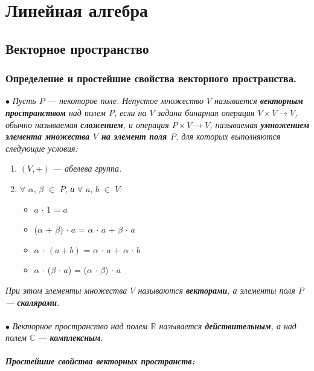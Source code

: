 \part{Линейная алгебра}
\chapter{Векторное пространство}
\section{Определение и простейшие свойства векторного пространства.}
$\bullet$ \textit{Пусть $P$ --- некоторое поле. Непустое множество $V$ называется \textbf{векторным пространством} над полем $P$, если на $V$ задана бинарная операция $V\times V \to V$, обычно называемая \textbf{сложением}, и операция $P\times V \to V$, называемая \textbf{умножением элемента множества $V$ на элемент поля $P$}, для которых выполняются следующие условия:}
\begin{enumerate} 
	\item \textit{ $(V, +)$ --- абелева группа.}
	\item $\forall$ $\alpha$, $\beta$ $\in$ $P$, \textit{и} $\forall$ $a$, $b$ $\in$ $V$:
	\begin{itemize} 
		\item $a$ $\cdot$ 1 = $a$
		\item ($\alpha$ + $\beta$) $\cdot$ $a$ = $\alpha$ $\cdot$ $a$ + $\beta$ $\cdot$ $a$
		\item $\alpha$ $\cdot$ $(a + b)$ = $\alpha$ $\cdot$ $a$ + $\alpha$ $\cdot$ $b$
		\item $\alpha$ $\cdot$ ($\beta$ $\cdot$ $a$) = ($\alpha$ $\cdot$ $\beta$)  $\cdot$ $a$
	\end{itemize}
\end{enumerate}
\textit{При этом элементы множества $V$ называются \textbf{векторами}, а элементы поля $P$ --- \textbf{скалярами}.}\\\\
$\bullet$ \textit{Векторное пространство над полем $\mathbb{R}$ называется \textbf{действительным}, а над полем $\mathbb{C}$ --- \textbf{комплексным}.}\\\\
\textit{\textbf{Простейшие свойства векторных пространств:}}
